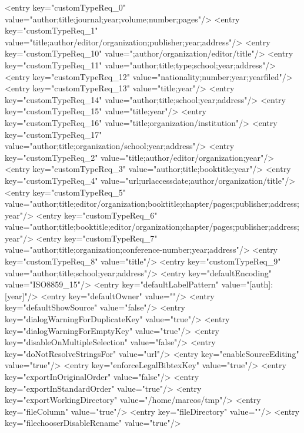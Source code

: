 \begin{codigo}[caption={Código de configuração do programa JabRef em XML}, label={codigo:config-jabref}, language=XML, breaklines=true]
            <entry key="customTypeReq_0" value="author;title;journal;year;volume;number;pages"/>
            <entry key="customTypeReq_1" value="title;author/editor/organization;publisher;year;address"/>
            <entry key="customTypeReq_10" value=";author/organization/editor/title"/>
            <entry key="customTypeReq_11" value="author;title;type;school;year;address"/>
            <entry key="customTypeReq_12" value="nationality;number;year;yearfiled"/>
            <entry key="customTypeReq_13" value="title;year"/>
            <entry key="customTypeReq_14" value="author;title;school;year;address"/>
            <entry key="customTypeReq_15" value="title;year"/>
            <entry key="customTypeReq_16" value="title;organization/institution"/>
            <entry key="customTypeReq_17" value="author;title;organization/school;year;address"/>
            <entry key="customTypeReq_2" value="title;author/editor/organization;year"/>
            <entry key="customTypeReq_3" value="author;title;booktitle;year"/>
            <entry key="customTypeReq_4" value="url;urlaccessdate;author/organization/title"/>
            <entry key="customTypeReq_5" value="author;title;editor/organization;booktitle;chapter/pages;publisher;address;year"/>
            <entry key="customTypeReq_6" value="author;title;booktitle;editor/organization;chapter/pages;publisher;address;year"/>
            <entry key="customTypeReq_7" value="author;title;organization;conference-number;year;address"/>
            <entry key="customTypeReq_8" value="title"/>
            <entry key="customTypeReq_9" value="author;title;school;year;address"/>
            <entry key="defaultEncoding" value="ISO8859_15"/>
            <entry key="defaultLabelPattern" value="[auth]:[year]"/>
            <entry key="defaultOwner" value=""/>
            <entry key="defaultShowSource" value="false"/>
            <entry key="dialogWarningForDuplicateKey" value="true"/>
            <entry key="dialogWarningForEmptyKey" value="true"/>
            <entry key="disableOnMultipleSelection" value="false"/>
            <entry key="doNotResolveStringsFor" value="url"/>
            <entry key="enableSourceEditing" value="true"/>
            <entry key="enforceLegalBibtexKey" value="true"/>
            <entry key="exportInOriginalOrder" value="false"/>
            <entry key="exportInStandardOrder" value="true"/>
            <entry key="exportWorkingDirectory" value="/home/marcos/tmp"/>
            <entry key="fileColumn" value="true"/>
            <entry key="fileDirectory" value=""/>
            <entry key="filechooserDisableRename" value="true"/>

\end{codigo}
